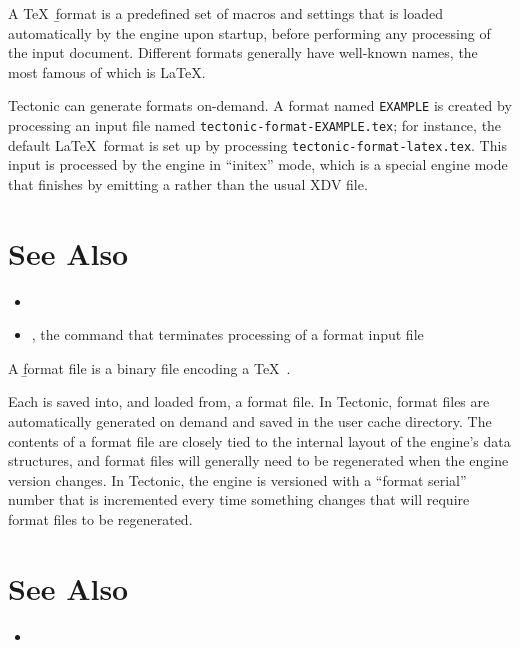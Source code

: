 
A \TeX\ \b{format} is a predefined set of macros and settings that is loaded
automatically by the engine upon startup, before performing any processing of
the input document. Different formats generally have well-known names, the most
famous of which is \LaTeX.

Tectonic can generate formats on-demand. A format named \texttt{EXAMPLE} is
created by processing an input file named \texttt{tectonic-format-EXAMPLE.tex};
for instance, the default \LaTeX\ format is set up by processing
\texttt{tectonic-format-latex.tex}. This input is processed by the engine in
“initex” mode, which is a special engine mode that finishes by emitting a
 rather than the usual XDV file.

\section*{See Also}

\begin{itemize}
\item {}
\item {}, the command that terminates processing of a format input file
\end{itemize}

\tduxEmit



A \b{format file} is a binary file encoding a \TeX\ .

Each  is saved into, and loaded from, a format file. In Tectonic,
format files are automatically generated on demand and saved in the user cache
directory. The contents of a format file are closely tied to the internal layout
of the engine's data structures, and format files will generally need to be
regenerated when the engine version changes. In Tectonic, the engine is
versioned with a “format serial” number that is incremented every time something
changes that will require format files to be regenerated.

\section*{See Also}

\begin{itemize}
\item {}
\end{itemize}
